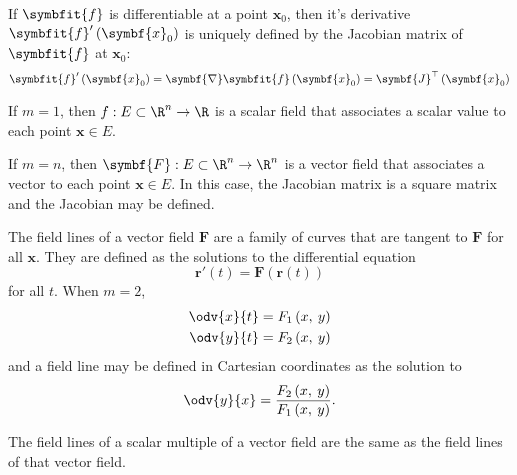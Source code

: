 \documentclass{article}
\begin{document}
If \(\symbfit{f}\) is differentiable at a point \(\symbf{x}_0\), then
it's derivative \(\symbfit{f}'\left( \symbf{x}_0 \right)\) is uniquely
defined by the Jacobian matrix of \(\symbfit{f}\) at \(\symbf{x}_0\):
\begin{equation*}
    \symbfit{f}'\left( \symbf{x}_0 \right) = \symbf{\nabla} \symbfit{f}\left( \symbf{x}_0 \right) = \symbf{J}^\top \left( \symbf{x}_0 \right)
\end{equation*}
\begin{definition}
    If \(m = 1\), then \(f : E \subset \R^n \to \R\) is a scalar field
    that associates a scalar value to each point \(\symbf{x} \in E\).
\end{definition}
\begin{definition}
    If \(m = n\), then \(\symbf{F} : E \subset \R^n \to \R^n\) is a
    vector field that associates a vector to each point \(\symbf{x} \in E\).
    In this case, the Jacobian matrix is a square matrix and the
    Jacobian may be defined.
\end{definition}
\begin{definition}
    The field lines of a vector field \(\symbf{F}\) are a family of
    curves that are tangent to \(\symbf{F}\) for all \(\symbf{x}\). They
    are defined as the solutions to the differential equation
    \begin{equation*}
        \symbf{r}'\left( t \right) = \symbf{F}\left( \symbf{r}\left( t \right) \right)
    \end{equation*}
    for all \(t\). When \(m = 2\),
    \begin{align*}
        \odv{x}{t} & = F_1\left( x,\: y \right) \\
        \odv{y}{t} & = F_2\left( x,\: y \right)
    \end{align*}
    and a field line may be defined in Cartesian coordinates as the
    solution to
    \begin{equation*}
        \odv{y}{x} = \frac{F_2\left( x,\: y \right)}{F_1\left( x,\: y \right)}.
    \end{equation*}
\end{definition}
\begin{lemma}
    The field lines of a scalar multiple of a vector field are the same
    as the field lines of that vector field.
\end{lemma}
\end{document}
